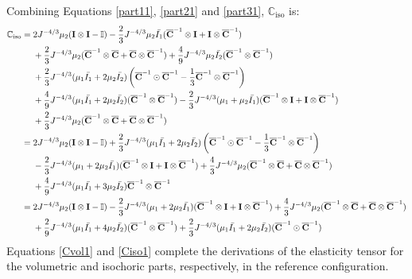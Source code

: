 Combining Equations \ref{part11}, \ref{part21} and \ref{part31}, $\mathbb{C}_\mathrm{iso}$ is:
\begin{equation} \label{Ciso1}
\begin{split}
\mathbb{C}_\mathrm{iso} 
= {} & 
2{J}^{-4/3}\mu_2(\bold{I} \otimes \bold{I} - \mathbb{I}) - \frac{2}{3}J^{-4/3}\mu_2\bar{I_1}({\overline{\bold{C}}}^{-1} \otimes \bold{I} + \bold{I} \otimes {\overline{\bold{C}}}^{-1}) \\
&+
\frac{2}{3}J^{-4/3}\mu_2({\overline{\bold{C}}}^{-1} \otimes {\overline{\bold{C}}} + {\overline{\bold{C}}} \otimes {\overline{\bold{C}}}^{-1}) + \frac{4}{9}J^{-4/3}\mu_2\bar{I_2}({\overline{\bold{C}}}^{-1} \otimes {\overline{\bold{C}}}^{-1}) \\
&+
\frac{2}{3}J^{-4/3}(\mu_1\bar{I_1} + 2\mu_2\bar{I_2}) \left ({\overline{\bold{C}}}^{-1} \odot {{\overline{\bold{C}}}}^{-1} - \frac{1}{3}{{\overline{\bold{C}}}}^{-1} \otimes {\overline{{\bold{C}}}}^{-1} \right) \\
&+
\frac{4}{9}J^{-4/3} (\mu_1\bar{I_1} + 2\mu_2\bar{I_2})({\overline{\bold{C}}}^{-1} \otimes {\overline{\bold{C}}}^{-1}) - \frac{2}{3}J^{-4/3}(\mu_1+\mu_2\bar{I_1})({\overline{\bold{C}}}^{-1} \otimes \bold{I} + \bold{I} \otimes {\overline{\bold{C}}}^{-1})\\
&+ \frac{2}{3}J^{-4/3}\mu_2({\overline{\bold{C}}}^{-1} \otimes {\overline{\bold{C}}}+{\overline{\bold{C}}} \otimes {\overline{\bold{C}}}^{-1})  \\
= {} &
2{J}^{-4/3}\mu_2(\bold{I} \otimes \bold{I} - \mathbb{I}) + \frac{2}{3}J^{-4/3}(\mu_1\bar{I_1} + 2\mu_2\bar{I_2})\left({\overline{\bold{C}}}^{-1} \odot {\overline{\bold{C}}}^{-1} - \frac{1}{3}{\overline{\bold{C}}}^{-1} \otimes {\overline{\bold{C}}}^{-1}\right) \\
&-
\frac{2}{3}J^{-4/3}(\mu_1 + 2\mu_2\bar{I_1})({\overline{\bold{C}}}^{-1} \otimes \bold{I} + \bold{I} \otimes {\overline{\bold{C}}}^{-1}) + \frac{4}{3}J^{-4/3}\mu_2({\overline{\bold{C}}}^{-1} \otimes {\overline{\bold{C}}} + {\overline{\bold{C}}} \otimes {\overline{\bold{C}}}^{-1}) \\
&+
\frac{4}{9}J^{-4/3}(\mu_1\bar{I_1} + 3\mu_2\bar{I_2}){\overline{\bold{C}}}^{-1} \otimes {\overline{\bold{C}}}^{-1} \\
= {} &
2{J}^{-4/3}\mu_2(\bold{I} \otimes \bold{I} - \mathbb{I}) - \frac{2}{3}J^{-4/3}(\mu_1 + 2\mu_2\bar{I_1})({\overline{\bold{C}}}^{-1} \otimes \bold{I} + \bold{I} \otimes {\overline{\bold{C}}}^{-1}) + \frac{4}{3}J^{-4/3}\mu_2({\overline{\bold{C}}}^{-1} \otimes {\overline{\bold{C}}} + {\overline{\bold{C}}} \otimes {\overline{\bold{C}}}^{-1}) \\
&+
\frac{2}{9}J^{-4/3}(\mu_1\bar{I_1} + 4\mu_2\bar{I_2}) ({\overline{\bold{C}}}^{-1} \otimes {\overline{\bold{C}}}^{-1}) + \frac{2}{3}J^{-4/3}(\mu_1\bar{I_1} + 2\mu_2\bar{I_2})({\overline{\bold{C}}}^{-1} \odot {\overline{\bold{C}}}^{-1}) 
\end{split}
\end{equation} 
Equations \ref{Cvol1} and \ref{Ciso1} complete the derivations of the elasticity tensor for the volumetric and isochoric parts, respectively, in the reference configuration.

